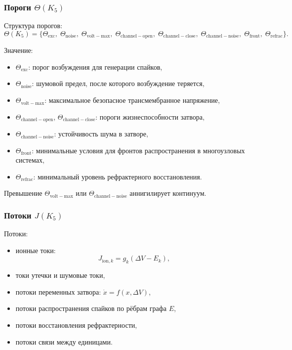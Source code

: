 \subsubsection{Пороги \texorpdfstring{$\Theta(K_5)$}{\Theta(K_5)}}

Структура порогов:
\[
\Theta(K_5)=\{
\Theta_{\mathrm{exc}},\;
\Theta_{\mathrm{noise}},\;
\Theta_{\mathrm{volt-max}},\;
\Theta_{\mathrm{channel-open}},\;
\Theta_{\mathrm{channel-close}},\;
\Theta_{\mathrm{channel-noise}},\;
\Theta_{\mathrm{front}},\;
\Theta_{\mathrm{refrac}}
\}.
\]

Значение:
\begin{itemize}
    \item $\Theta_{\mathrm{exc}}$: порог возбуждения для генерации спайков,
    \item $\Theta_{\mathrm{noise}}$: шумовой предел, после которого возбуждение
          теряется,
    \item $\Theta_{\mathrm{volt-max}}$: максимальное безопасное
          трансмембранное напряжение,
    \item $\Theta_{\mathrm{channel-open}}$, $\Theta_{\mathrm{channel-close}}$:
          пороги жизнеспособности затвора,
    \item $\Theta_{\mathrm{channel-noise}}$: устойчивость шума в затворе,
    \item $\Theta_{\mathrm{front}}$: минимальные условия для фронтов
          распространения в многоузловых системах,
    \item $\Theta_{\mathrm{refrac}}$: минимальный уровень рефрактерного
          восстановления.
\end{itemize}

Превышение $\Theta_{\mathrm{volt-max}}$ или
$\Theta_{\mathrm{channel-noise}}$ аннигилирует континуум.

\subsubsection{Потоки \texorpdfstring{$J(K_5)$}{J(K_5)}}

Потоки:
\begin{itemize}
    \item ионные токи:
    \[
    J_{\mathrm{ion},k} = g_k(\Delta V - E_k),
    \]
    \item токи утечки и шумовые токи,
    \item потоки переменных затвора:
          $\dot{x} = f(x,\Delta V)$,
    \item потоки распространения спайков по рёбрам графа $E$,
    \item потоки восстановления рефрактерности,
    \item потоки связи между единицами.
\end{itemize}

